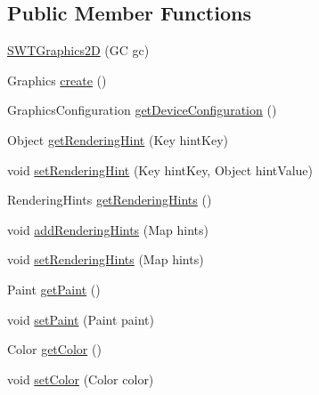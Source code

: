 \subsection*{Public Member Functions}
\begin{DoxyCompactItemize}
\item 
\mbox{\hyperlink{classorg_1_1jfree_1_1experimental_1_1swt_1_1_s_w_t_graphics2_d_a4b034930f286eddad2f0863daeff527a}{S\+W\+T\+Graphics2D}} (GC gc)
\item 
Graphics \mbox{\hyperlink{classorg_1_1jfree_1_1experimental_1_1swt_1_1_s_w_t_graphics2_d_a99ae23ab11c50f17b32ac25d27c12e2e}{create}} ()
\item 
Graphics\+Configuration \mbox{\hyperlink{classorg_1_1jfree_1_1experimental_1_1swt_1_1_s_w_t_graphics2_d_acf0afe37721516d4043c52b8ee8172d6}{get\+Device\+Configuration}} ()
\item 
Object \mbox{\hyperlink{classorg_1_1jfree_1_1experimental_1_1swt_1_1_s_w_t_graphics2_d_a9dadf87bbe1bd875799c1764834fade2}{get\+Rendering\+Hint}} (Key hint\+Key)
\item 
void \mbox{\hyperlink{classorg_1_1jfree_1_1experimental_1_1swt_1_1_s_w_t_graphics2_d_a9f2008ec82fdd536a5e68de42a31992a}{set\+Rendering\+Hint}} (Key hint\+Key, Object hint\+Value)
\item 
Rendering\+Hints \mbox{\hyperlink{classorg_1_1jfree_1_1experimental_1_1swt_1_1_s_w_t_graphics2_d_a8a936ffeb9c6d133f1fe91ffcd87b319}{get\+Rendering\+Hints}} ()
\item 
void \mbox{\hyperlink{classorg_1_1jfree_1_1experimental_1_1swt_1_1_s_w_t_graphics2_d_ab7a602eb7f5ad020d212c36ddfdfd44c}{add\+Rendering\+Hints}} (Map hints)
\item 
void \mbox{\hyperlink{classorg_1_1jfree_1_1experimental_1_1swt_1_1_s_w_t_graphics2_d_adcf05fe2a29c5bf8aa05ae31c6fb5a7e}{set\+Rendering\+Hints}} (Map hints)
\item 
Paint \mbox{\hyperlink{classorg_1_1jfree_1_1experimental_1_1swt_1_1_s_w_t_graphics2_d_a89618656bba11128fda80e24a4b944a8}{get\+Paint}} ()
\item 
void \mbox{\hyperlink{classorg_1_1jfree_1_1experimental_1_1swt_1_1_s_w_t_graphics2_d_a919af710ac35847e41844dad43ed02ec}{set\+Paint}} (Paint paint)
\item 
Color \mbox{\hyperlink{classorg_1_1jfree_1_1experimental_1_1swt_1_1_s_w_t_graphics2_d_ad1120d4f056f30d9801f65a898f89ed7}{get\+Color}} ()
\item 
void \mbox{\hyperlink{classorg_1_1jfree_1_1experimental_1_1swt_1_1_s_w_t_graphics2_d_aac2f5469f458244f52ea8dc733faa7ec}{set\+Color}} (Color color)

\end{DoxyCompactItemize}
